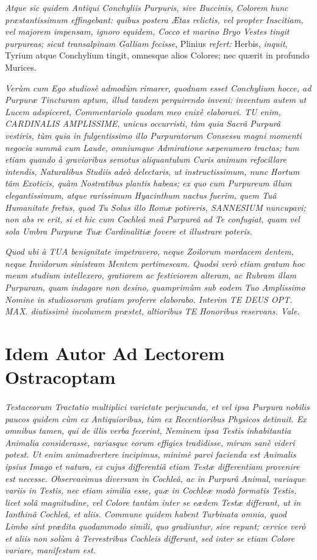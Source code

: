 \documentclass[a4paper, 11pt, oneside, polutonikogreek, german]{article}
\begin{document}
\emph{Atque sic quidem Antiqui Conchyliis Purpuris, sive Buccinis, Colorem hunc præstantissimum effingebant: quibus postera Ætas relictis, vel propter Inscitiam, vel majorem impensam, ignoro equidem, Cocco et marino Bryo Vestes tingit purpureas; sicut transalpinam Galliam fecisse}, Plinius \emph{refert:} Herbis, \emph{inquit}, Tyrium atque Conchylium tingit, omnesque alios Colores; nec quærit in profundo Murices.

\emph{Verùm cum Ego studiosè admodùm rimarer, quodnam esset Conchylium hocce, ad Purpuræ Tincturam aptum, illud tandem perquirendo inveni: inventum autem ut Lucem adspiceret, Commentariolo quodam meo enixè elaboravi. TU enim, CARDINALIS AMPLISSIME, unicus occurristi, tùm quia Sacrâ Purpurâ vestiris, tùm quia in fulgentissimo illo Purpuratorum Consessu magni momenti negocia summâ cum Laude, omniumque Admiratione sæpenumero tractas; tum etiam quando à gravioribus semotus aliquantulum Curis animum refocillare intendis, Naturalibus Studiis adeò delectaris, ut instructissimum, nunc Hortum tâm Exoticis, quàm Nostratibus plantis habeas; ex quo cum Purpureum illum elegantissimum, atque rarissimum Hyacinthum nactus fuerim, quem Tuâ Humanitate fretus, quod Tu Solus illo Romæ potireris, SANNESIUM nuncupavi; non abs re erit, si et hic cum Cochleâ meâ Purpureâ ad Te confugiat, quam vel sola Umbra Purpuræ Tuæ Cardinalitiæ fovere et illustrare poteris.}

\emph{Quod ubi à TUA benignitate impetravero, neque Zoilorum mordacem dentem, neque Invidorum sinistram Mentem pertimescam. Quodsi verò etiam gratum hoc meum studium intellexero, gratiorem ac festiviorem alteram, ac Rubram illam Purpuram, quam indagare non desino, quamprimùm sub eodem Tuo Amplissimo Nomine in studiosorum gratiam proferre elaborabo. Interim TE DEUS OPT. MAX. diutissimè incolumem præstet, altioribus TE Honoribus reservans. Vale.}

\clearpage
\section*{Idem Autor Ad Lectorem Ostracoptam}
\paragraph{}
\emph{Testaceorum Tractatio multiplici varietate perjucunda, et vel ipsa Purpura nobilis paucos quidem cùm ex Antiquioribus, tùm ex Recentioribus Physicos detinuit. Ex omnibus tamen, qui de illis verba fecerint, Neminem ipsa Testis inhabitantia Animalia considerasse, variasque eorum effigies tradidisse, mirum sanè videri potest. Ut enim animadvertere incipimus, minimè parvi facienda est Animalis ipsius Imago et natura, ex cujus differentiâ etiam Testæ differentiam provenire est necesse. Observavimus diversum in Cochleâ, ac in Purpurâ Animal, variaque variis in Testis, nec etiam similia esse, quæ in Cochleæ modò formatis Testis, licet solâ magnitudine, vel Colore tantùm inter se eædem Testæ differant, ut in Ianthinâ Cochleâ, et aliis. Commune quidem habent Turbinata omnia, quod Limbo sint prædita quodammodo simili, quo gradiuntur, sive repunt; cervice verò et aliis non solùm à Terrestribus Cochleis differunt, sed inter se etiam Colore variare, manifestum est.}
\end{document}
